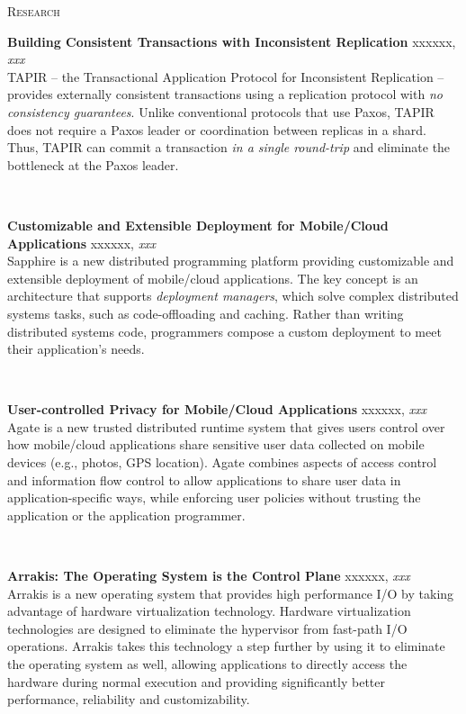 \documentclass[10pt,times]{report}
\newlength{\sectiongap}
\newlength{\entrygap}
\newlength{\sectioncolwidth}
\newlength{\colgap}
\newlength{\stuffwidth}
\def\ifEqString#1#2{\def\testa{#1}\def\testb{#2}%
  \ifx\testa\testb}
\newenvironment{rtable}{
  \begin{minipage}{\textwidth}
  }{
  \end{minipage}
}
\newenvironment{rentry}[3][xxx]{
  \begin{minipage}[t]{\hsize}
    \textbf{#2}\ifEqString{#1}{xxx}\relax\else, \textit{#1}\fi
    \hspace{\stretch{1}} #3 \\
  }{
    \removelastskip
  \end{minipage}
  \\[\entrygap]  %
}
\newenvironment{rsection}[1]{
  \begin{minipage}[t]{\sectioncolwidth}
    \textsc{#1}
  \end{minipage}
  \hspace{\colgap}
  \begin{minipage}[t]{\stuffwidth}
  }{
    \removelastskip
  \end{minipage}
  \\[\sectiongap]
}
\begin{document}
\begin{rtable}
  \begin{rsection}{Research}
    \begin{rentry}{Building Consistent Transactions with Inconsistent
        Replication}{}
      TAPIR -- the Transactional Application Protocol for Inconsistent
      Replication -- provides externally consistent transactions using a
      replication protocol with \emph{no consistency guarantees}.
      Unlike conventional protocols that use Paxos, TAPIR does not
      require a Paxos leader or coordination between replicas in a
      shard. Thus, TAPIR can commit a transaction \emph{in a single
        round-trip} and eliminate the bottleneck at the Paxos leader.
    \end{rentry}

    \begin{rentry}{Customizable and Extensible Deployment for
        Mobile/Cloud Applications}{}
      Sapphire is a new distributed programming platform providing
      customizable and extensible deployment of mobile/cloud
      applications. The key concept is an architecture that supports
      \emph{deployment managers}, which solve complex distributed
      systems tasks, such as code-offloading and caching. Rather than
      writing distributed systems code, programmers compose a custom
      deployment to meet their application's needs.
    \end{rentry}

    \begin{rentry}{User-controlled Privacy for Mobile/Cloud Applications}{}
      Agate is a new trusted distributed runtime system that gives
      users control over how mobile/cloud applications share sensitive
      user data collected on mobile devices (e.g., photos, GPS
      location). Agate combines aspects of access control and
      information flow control to allow applications to share user
      data in application-specific ways, while enforcing user policies
      without trusting the application or the application programmer.
    \end{rentry}

    \begin{rentry}{Arrakis: The Operating System is the Control Plane}{}
      Arrakis is a new operating system that provides high performance
      I/O by taking advantage of hardware virtualization
      technology. Hardware virtualization technologies are designed to
      eliminate the hypervisor from fast-path I/O operations. Arrakis
      takes this technology a step further by using it to eliminate
      the operating system as well, allowing applications to directly
      access the hardware during normal execution and providing
      significantly better performance, reliability and
      customizability.
    \end{rentry}


\end{rsection}
\end{rtable}
\end{document}
